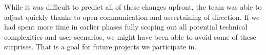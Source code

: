 \documentclass[12pt, titlepage]{article}
\begin{document}
\begin{enumerate}
While it was difficult to predict all of these changes upfront, the team was able to adjust 
quickly thanks to open communication and ascertaining of direction. If we had spent more 
time in earlier phases fully scoping out all potential technical complexities and user 
scenarios, we might have been able to avoid some of these surprises. That is a goal for 
future projects we participate in.
\end{enumerate}
\end{document}
